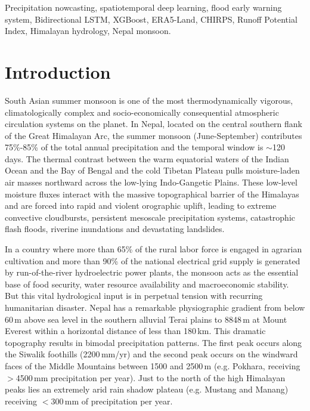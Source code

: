 \documentclass[journal]{IEEEtran}
\begin{document}
\begin{IEEEkeywords}
Precipitation nowcasting, spatiotemporal deep learning, flood early warning system, Bidirectional LSTM, XGBoost, ERA5-Land, CHIRPS, Runoff Potential Index, Himalayan hydrology, Nepal monsoon.
\end{IEEEkeywords}

\section{Introduction}

 South Asian summer monsoon is one of the most thermodynamically vigorous, climatologically complex and socio-economically consequential atmospheric circulation systems on the planet. In Nepal, located on the central southern flank of the Great Himalayan Arc, the summer monsoon (June-September) contributes 75\%-85\% of the total annual precipitation and the temporal window is $\sim$120 days. The thermal contrast between the warm equatorial waters of the Indian Ocean and the Bay of Bengal and the cold Tibetan Plateau pulls moisture-laden air masses northward across the low-lying Indo-Gangetic Plains. These low-level moisture fluxes interact with the massive topographical barrier of the Himalayas and are forced into rapid and violent orographic uplift, leading to extreme convective cloudbursts, persistent mesoscale precipitation systems, catastrophic flash floods, riverine inundations and devastating landslides.

In a country where more than 65\% of the rural labor force is engaged in agrarian cultivation and more than 90\% of the national electrical grid supply is generated by run-of-the-river hydroelectric power plants, the monsoon acts as the essential base of food security, water resource availability and macroeconomic stability. But this vital hydrological input is in perpetual tension with recurring humanitarian disaster. Nepal has a remarkable physiographic gradient from below 60\,m above sea level in the southern alluvial Terai plains to 8848\,m at Mount Everest within a horizontal distance of less than 180\,km. This dramatic topography results in bimodal precipitation patterns. The first peak occurs along the Siwalik foothills (2200\,mm/yr) and the second peak occurs on the windward faces of the Middle Mountains between 1500 and 2500\,m (e.g. Pokhara, receiving $>$4500\,mm precipitation per year). Just to the north of the high Himalayan peaks lies an extremely arid rain shadow plateau (e.g. Mustang and Manang) receiving $<$300\,mm of precipitation per year.
\end{document}
